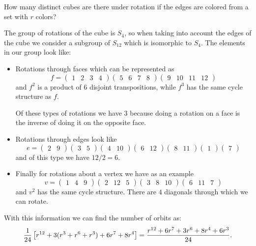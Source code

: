 \documentclass[12pt]{memoir}
\begin{document}
\begin{Ej}[6.9 Sagan]
    How many distinct cubes are there under rotation if the edges are colored from a set with $r$ colors? 
\end{Ej}
\begin{ptcbr}
    The group of rotations of the cube is $S_4$, so when taking into account the edges of the cube we consider a subgroup of $S_{12}$ which is isomorphic to $S_4$. The elements in our group look like:
    \begin{itemize}
        \itemsep=-0.4em
        \item Rotations through faces which can be represented as 
        $$f=\begin{pmatrix}1&2&3&4\end{pmatrix}\begin{pmatrix}5&6&7&8\end{pmatrix}\begin{pmatrix}9&10&11&12\end{pmatrix}$$
        and $f^2$ is a product of $6$ disjoint transpositions, while $f^3$ has the same cycle structure as $f$.\par 
        Of these types of rotations we have $3$ because doing a rotation on a face is the inverse of doing it on the opposite face.
        \item Rotations through edges look like 
        $$e=\begin{pmatrix}2&9\end{pmatrix}\begin{pmatrix}3&5\end{pmatrix}\begin{pmatrix}4&10\end{pmatrix}\begin{pmatrix}6&12\end{pmatrix}\begin{pmatrix}8&11\end{pmatrix}\begin{pmatrix}1\end{pmatrix}\begin{pmatrix}7\end{pmatrix}$$
        and of this type we have $12/2=6$.
        \item Finally for rotations about a vertex we have as an example 
        $$v=\begin{pmatrix}1&4&9\end{pmatrix}\begin{pmatrix}2&12&5\end{pmatrix}\begin{pmatrix}3&8&10\end{pmatrix}\begin{pmatrix}6&11&7\end{pmatrix}$$
        and $v^2$ has the same cycle structure. There are $4$ diagonals through which we can rotate.
    \end{itemize}
With this information we can find the number of orbits as:
$$\frac{1}{24}\left\lbrack r^{12}+3(r^3+r^6+r^3)+6r^7+8r^4\right\rbrack=\frac{r^{12}+6r^7+3r^6+8r^4+6r^3}{24}.$$
\end{ptcbr}
\end{document}
